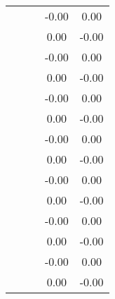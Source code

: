 \begin{table}
\begin{tabular}{c|cc|cc|}
\multicolumn{1}{|c|}{} & \multicolumn{1}{|c|}{} & \multicolumn{1}{|c|}{} & \multicolumn{1}{|c|}{     -0.00} & \multicolumn{1}{|c|}{      0.00} \\ 
\multicolumn{1}{|c|}{} & \multicolumn{1}{|c|}{} & \multicolumn{1}{|c|}{} & \multicolumn{1}{|c|}{      0.00} & \multicolumn{1}{|c|}{     -0.00} \\ 
\multicolumn{1}{|c|}{} & \multicolumn{1}{|c|}{} & \multicolumn{1}{|c|}{} & \multicolumn{1}{|c|}{     -0.00} & \multicolumn{1}{|c|}{      0.00} \\ 
\multicolumn{1}{|c|}{} & \multicolumn{1}{|c|}{} & \multicolumn{1}{|c|}{} & \multicolumn{1}{|c|}{      0.00} & \multicolumn{1}{|c|}{     -0.00} \\ 
\multicolumn{1}{|c|}{} & \multicolumn{1}{|c|}{} & \multicolumn{1}{|c|}{} & \multicolumn{1}{|c|}{     -0.00} & \multicolumn{1}{|c|}{      0.00} \\ 
\multicolumn{1}{|c|}{} & \multicolumn{1}{|c|}{} & \multicolumn{1}{|c|}{} & \multicolumn{1}{|c|}{      0.00} & \multicolumn{1}{|c|}{     -0.00} \\ 
\multicolumn{1}{|c|}{} & \multicolumn{1}{|c|}{} & \multicolumn{1}{|c|}{} & \multicolumn{1}{|c|}{     -0.00} & \multicolumn{1}{|c|}{      0.00} \\ 
\multicolumn{1}{|c|}{} & \multicolumn{1}{|c|}{} & \multicolumn{1}{|c|}{} & \multicolumn{1}{|c|}{      0.00} & \multicolumn{1}{|c|}{     -0.00} \\ 
\multicolumn{1}{|c|}{} & \multicolumn{1}{|c|}{} & \multicolumn{1}{|c|}{} & \multicolumn{1}{|c|}{     -0.00} & \multicolumn{1}{|c|}{      0.00} \\ 
\multicolumn{1}{|c|}{} & \multicolumn{1}{|c|}{} & \multicolumn{1}{|c|}{} & \multicolumn{1}{|c|}{      0.00} & \multicolumn{1}{|c|}{     -0.00} \\ 
\multicolumn{1}{|c|}{} & \multicolumn{1}{|c|}{} & \multicolumn{1}{|c|}{} & \multicolumn{1}{|c|}{     -0.00} & \multicolumn{1}{|c|}{      0.00} \\ 
\multicolumn{1}{|c|}{} & \multicolumn{1}{|c|}{} & \multicolumn{1}{|c|}{} & \multicolumn{1}{|c|}{      0.00} & \multicolumn{1}{|c|}{     -0.00} \\ 
\multicolumn{1}{|c|}{} & \multicolumn{1}{|c|}{} & \multicolumn{1}{|c|}{} & \multicolumn{1}{|c|}{     -0.00} & \multicolumn{1}{|c|}{      0.00} \\ 
\multicolumn{1}{|c|}{} & \multicolumn{1}{|c|}{} & \multicolumn{1}{|c|}{} & \multicolumn{1}{|c|}{      0.00} & \multicolumn{1}{|c|}{     -0.00} \\ 

\end{tabular}
\end{table}
